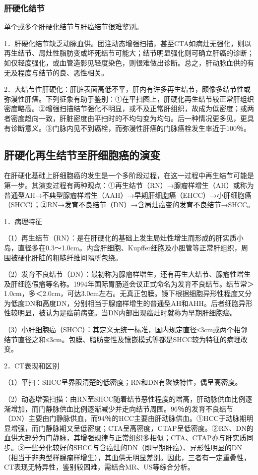 \subsubsection{肝硬化结节}

单个或多个肝硬化结节与肝癌结节很难鉴别。

1．肝硬化结节缺乏动脉血供。团注动态增强扫描，甚至CTA如病灶无强化，则以再生结节、局灶性脂肪变或坏死结节可能大；结节明显强化则可确立肝癌的诊断；如仅轻度强化，或血管造影见轻度染色，则很难做出诊断。总之，肝动脉血供的有无及程度与结节的良、恶性相关。

2．大结节性肝硬化：肝脏表面高低不平，肝内有许多再生结节，颇像多结节性或弥漫性肝癌。下列征象有助于鉴别：①在平扫图上，肝硬化再生结节较正常肝组织密度略高。②增强扫描结节强化不明显，或不及正常肝组织，故成为低密度；或两者密度趋向一致，肝脏密度由平扫时的不均匀变为均匀。后一种情况更多见，更具有诊断意义。③门脉内见不到癌栓，而弥漫性肝癌的门脉癌栓发生率近于100％。

\subsection{肝硬化再生结节至肝细胞癌的演变}

在肝硬化基础上肝细胞癌的发生是一个多阶段过程，在这一过程中再生结节可能是第一步。其演变过程有两种观点：①再生结节（RN）→腺瘤样增生（AH）或称为普通型AH→不典型腺瘤样增生（AAH）→早期肝细胞癌（EHCC）→小肝细胞癌（SHCC）；②RN→发育不良结节（DN）→含局灶癌变的发育不良结节→SHCC。

1．病理特征

（1）再生结节（RN）：是在肝硬化的基础上发生局灶性增生而形成的肝实质小岛，直径多在0.3～1.0cm。内含肝细胞、Kupffer细胞及小胆管等正常肝组织，周围被硬化肝脏的粗糙纤维间隔所包绕。

（2）发育不良结节（DN）：最初称为腺瘤样增生，还有再生大结节、腺瘤性增生及肝细胞假瘤等名称。1994年国际胃肠道会议正式命名为发育不良结节。结节常＞1.0cm，多＜2.0cm，可达3.0cm左右。无真正包膜。镜下根据细胞异形性程度又分为低度DN和高度DN，分别相当于腺瘤样增生的普通型AH和AHH。后者细胞异形性较明显，被认为是癌前病变。当DN内部出现癌灶时就称为早期肝细胞癌。

（3）小肝细胞癌（SHCC）：其定义无统一标准，国内规定直径≤3cm或两个相邻结节直径之和≤3cm。包膜、脂肪变性及镶嵌模式等都是SHCC较为特征的病理改变。

2．CT表现和区别

（1）平扫：SHCC呈界限清楚的低密度；RN和DN有聚铁特性，偶呈高密度。

（2）动态增强扫描：由RN至SHCC随着结节恶性程度的增高，肝动脉供血比例逐渐增加，而门静脉供血比例逐渐减少并走向结节周围。96％的发育不良结节（DN）主要由门静脉供血，而94％的HCC主要由肝动脉供血。①HCC于动脉期明显增强，而门静脉期又呈低密度；CTA呈高密度，CTAP呈低密度。②RN、DN的血供大部分为门静脉，其增强规律与正常组织多相似；CTA、CTAP亦与肝实质同步。③一些分化较好的SHCC与含癌灶的DN（即早期肝癌）、异形性明显的DN（相当于非典型样腺瘤样增生），其血供无明显差别。因此，三者有一定重叠性，CT表现无特异性，鉴别较困难，需结合MR、US等综合分析。

